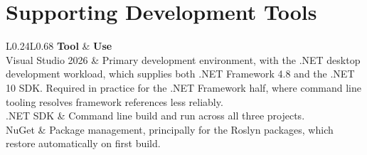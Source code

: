 \section{Supporting Development Tools}

\begin{table}[htbp]
	\centering
	\caption{Supporting tools}\label{tab:supporting}
	\begin{tabular}{L{0.24\textwidth}L{0.68\textwidth}}
\toprule
	\textbf{Tool} & \textbf{Use} \\
	\midrule
Visual Studio 2026 & Primary development environment, with the .NET desktop
	development workload, which supplies both .NET Framework 4.8 and the .NET 10
	SDK. Required in practice for the .NET Framework half, where command line
	tooling resolves framework references less reliably. \\
	\addlinespace
	.NET SDK & Command line build and run across all three projects. \\
	\addlinespace
	NuGet & Package management, principally for the Roslyn packages, which restore
	automatically on first build. \\
	\bottomrule
	\end{tabular}
\end{table}
